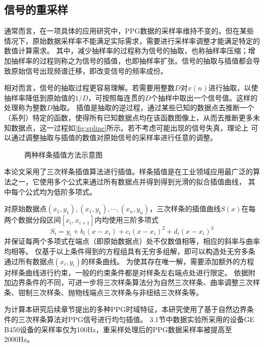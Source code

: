 \subsection{信号的重采样}
通常而言，在一项具体的应用研究中，PPG数据的采样率维持不变的。但在某些情况下，原始数据采样率不能满足实际需求，需要进行采样率调整才能满足特定的数值计算需求。
其中，减少抽样率的过程称为信号的抽取，也称抽样率压缩；增加抽样率的过程则称之为信号的插值，也即抽样率扩张\cite{Cheng2008}。信号的抽取与插值都会导致原始信号出现频谱迁移，即改变信号的频率成份\cite{Cheng2008}。

相对而言，信号的抽取过程更容易理解。若需要用整数$D$对$x(n)$进行抽取，以使抽样率降低到原始值的$1/D$，可按照每连贯的$D$个抽样中取出一个信号值。这样的处理称为整数$D$抽取\cite{Cheng2008}。
插值是抽取的逆过程，通过某些已知的数据点去推断一个（系列）特定的函数，使得所有已知数据点均在该函数图像上，从而去推断更多未知数据点，这一过程如\autoref{fig:spline}所示。若不考虑可能出现的信号失真，理论上
可以通过调整抽取与插值的数值对原始信号的采样率进行任意的调整。
\begin{figure}[htbp]
    \centering
    \quad
    \caption{\label{fig:spline}两种样条插值方法示意图}
\end{figure}

本论文采用了三次样条插值算法进行插值\cite{Timothy2018,Carl2008}。样条插值是在工业领域应用最广泛的算法之一，它使用多个公式来通过所有数据点并得到得到光滑的拟合插值曲线，
其中每个公式均为低阶多项式。

对原始数据点$(x_1,y_1),(x_1,y_1),\cdots,(x_n,y_n)$，三次样条的插值曲线$S(x)$在每两个数据分段区间$[x_i,x_{i+1}]$内均使用三阶多项式
\begin{equation}
    \label{equ:spline}
    S_{i}=y_{i}+b_{i}(x-x_{i})+c_{i}{(x-x_{i})}^2+d_{i}{(x-x_{i})}^3
\end{equation}
并保证每两个多项式在端点（即原始数据点）处不仅数值相等，相应的斜率与曲率均相等。
仅基于以上条件得到的方程组具有无穷多组解，即可以构造处无穷多条通过所有数据点$(x_i,y_i)$的样条曲线。
为使其存在唯一解，需要添加额外的方程对样条曲线进行约束，一般的约束条件都是对样条左右端点处进行限定。
依据附加边界条件的不同，可进一步将三次样条算法分为自然三次样条、曲率调整三次样条、钳制三次样条、抛物线端点三次样条与非纽结三次样条等\cite{Timothy2018}。

为计算本研究后续章节提出的多种PPG时域特征，本研究使用了基于自然边界条件的三次样条算法对PPG信号进行均匀插值。
3.1节中数据实验所采用的设备GE B450设备的采样率仅为100Hz，重采样处理后的PPG数据采样率被提高至2000Hz。

